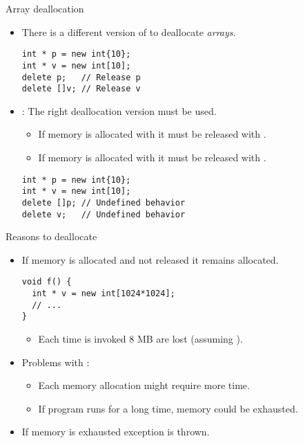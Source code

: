 \begin{frame}[fragile]{Array deallocation}
\begin{itemize}
  \item There is a different version of  to deallocate \emph{arrays}.
\begin{lstlisting}
int * p = new int{10};
int * v = new int[10];
delete p;   // Release p
delete []v; // Release v
\end{lstlisting}

  \vfill\pause
  \item {}: 
        The right deallocation version must be used.
    \begin{itemize}
      \item If memory is allocated with  it must be released with .
      \item If memory is allocated with  it must be released with .
    \end{itemize}
\begin{lstlisting}
int * p = new int{10};
int * v = new int[10];
delete []p; // Undefined behavior
delete v;   // Undefined behavior
\end{lstlisting}
\end{itemize}
\end{frame}

\begin{frame}[fragile]{Reasons to deallocate}
\begin{itemize}
  \item If memory is allocated and not released it remains allocated.
\begin{lstlisting}
void f() {
  int * v = new int[1024*1024];
  // ...
}
\end{lstlisting}
    \begin{itemize}
      \item Each time  is invoked 8 MB are lost (assuming ).
    \end{itemize}

  \item Problems with :
    \begin{itemize}
      \item Each memory allocation might require more time.
      \item If program runs for a long time, memory could be exhausted.
    \end{itemize}

  \item If memory is exhausted  exception is thrown.
\end{itemize}
\end{frame}
